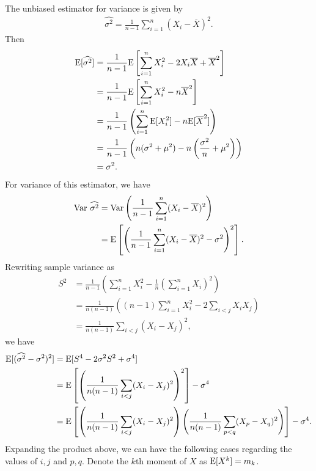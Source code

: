 The unbiased estimator for variance is given by
\begin{align*}
\widehat{\sigma^2} = \frac{1}{n-1}\sum_{i=1}^n (X_i - \overline{X})^2.
\end{align*}
Then
\begin{align*}
\mathrm{E}[\widehat{\sigma^2}] & = \frac{1}{n-1} \mathrm{E}\left[\sum_{i=1}^n X_i^2 - 2X_i\overline{X} + \overline{X}^2 \right] \\
& = \frac{1}{n-1} \mathrm{E}\left[\sum_{i=1}^n X_i^2 - n\overline{X}^2 \right] \\
& = \frac{1}{n-1}\left(\sum_{i=1}^n \mathrm{E}[X_i^2] - n\mathrm{E}[\overline{X}^2] \right) \\
& = \frac{1}{n-1}\left(n(\sigma^2 + \mu^2) - n\left(\frac{\sigma^2}{n} + \mu^2 \right) \right) \\
& = \sigma^2.
\end{align*}
For variance of this estimator, we have
\begin{align*}
\mathrm{Var}\ \widehat{\sigma^2} & = \mathrm{Var}\left(\frac{1}{n-1}\sum_{i=1}^n (X_i - \overline{X})^2 \right) \\
& = \mathrm{E}\left[\left(\frac{1}{n-1}\sum_{i=1}^n (X_i - \overline{X})^2 - \sigma^2\right)^2 \right].
\end{align*}
Rewriting sample variance as
\begin{align*}
S^2 & = \frac{1}{n-1} \left(\sum_{i=1}^n X_i^2 - \frac{1}{n}\left(\sum_{i=1}^n X_i \right)^2 \right) \\
& = \frac{1}{n(n-1)} \left((n-1)\sum_{i=1}^n X_i^2 - 2\sum_{i<j}X_iX_j \right) \\
& = \frac{1}{n(n-1)} \sum_{i<j} (X_i - X_j)^2,
\end{align*}
we have
\begin{align*}
\mathrm{E}[(\widehat{\sigma^2} - \sigma^2)^2] & = \mathrm{E}[S^4 - 2\sigma^2S^2 + \sigma^4] \\
& = \mathrm{E}\left[\left(\frac{1}{n(n-1)} \sum_{i<j} (X_i - X_j)^2 \right)^2 \right] - \sigma^4 \\
& = \mathrm{E}\left[\left(\frac{1}{n(n-1)} \sum_{i<j} (X_i - X_j)^2 \right)\left(\frac{1}{n(n-1)} \sum_{p<q} (X_p - X_q)^2 \right) \right] - \sigma^4.
\end{align*}
Expanding the product above, we can have the following cases regarding the values of $i, j$ and $p, q$. Denote the $k$th moment of $X$ as $\mathrm{E}[X^k] = m_k$.
